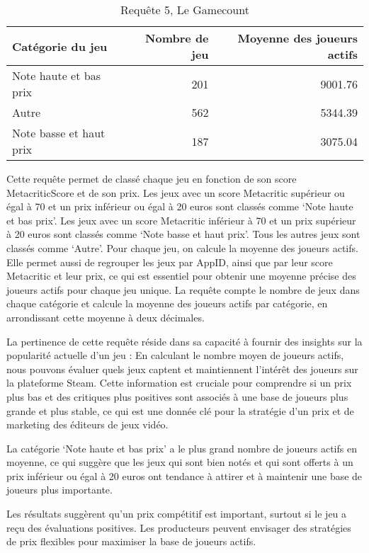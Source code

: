 \documentclass[mstat,12pt]{unswthesis}
\begin{document}
\begingroup\fontsize{10}{12}\selectfont

\begin{longtable}[t]{lrr}
\caption{\label{tab:results-table gamecount invisible}Requête 5, Le Gamecount}\\
\toprule
Catégorie du jeu & Nombre de jeu & Moyenne des joueurs actifs\\
\midrule
Note haute et bas prix & 201 & 9001.76\\
Autre & 562 & 5344.39\\
Note basse et haut prix & 187 & 3075.04\\
\bottomrule
\end{longtable}
\endgroup{}

Cette requête permet de classé chaque jeu en fonction de son score
MetacriticScore et de son prix. Les jeux avec un score Metacritic
supérieur ou égal à 70 et un prix inférieur ou égal à 20 euros sont
classés comme `Note haute et bas prix'. Les jeux avec un score
Metacritic inférieur à 70 et un prix supérieur à 20 euros sont classés
comme `Note basse et haut prix'. Tous les autres jeux sont classés comme
`Autre'. Pour chaque jeu, on calcule la moyenne des joueurs actifs. Elle
permet aussi de regrouper les jeux par AppID, ainsi que par leur score
Metacritic et leur prix, ce qui est essentiel pour obtenir une moyenne
précise des joueurs actifs pour chaque jeu unique. La requête compte le
nombre de jeux dans chaque catégorie et calcule la moyenne des joueurs
actifs par catégorie, en arrondissant cette moyenne à deux décimales.

La pertinence de cette requête réside dans sa capacité à fournir des
insights sur la popularité actuelle d'un jeu : En calculant le nombre
moyen de joueurs actifs, nous pouvons évaluer quels jeux captent et
maintiennent l'intérêt des joueurs sur la plateforme Steam. Cette
information est cruciale pour comprendre si un prix plus bas et des
critiques plus positives sont associés à une base de joueurs plus grande
et plus stable, ce qui est une donnée clé pour la stratégie d'un prix et
de marketing des éditeurs de jeux vidéo.

La catégorie `Note haute et bas prix' a le plus grand nombre de joueurs
actifs en moyenne, ce qui suggère que les jeux qui sont bien notés et
qui sont offerts à un prix inférieur ou égal à 20 euros ont tendance à
attirer et à maintenir une base de joueurs plus importante.

Les résultats suggèrent qu'un prix compétitif est important, surtout si
le jeu a reçu des évaluations positives. Les producteurs peuvent
envisager des stratégies de prix flexibles pour maximiser la base de
joueurs actifs.
\end{document}
